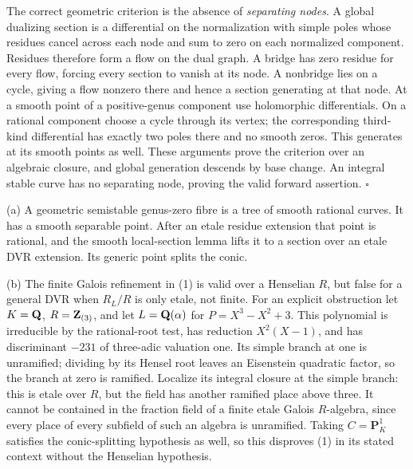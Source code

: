 \documentclass[11pt]{article}
\let\chapterexercise\exercise
\renewcommand{\exercise}[2]{\Needspace{8\baselineskip}\chapterexercise{#1}{#2}}
\begin{document}
The correct geometric criterion is the absence of \emph{separating nodes}. A global dualizing section is a differential on the normalization with simple poles whose residues cancel across each node and sum to zero on each normalized component. Residues therefore form a flow on the dual graph. A bridge has zero residue for every flow, forcing every section to vanish at its node. A nonbridge lies on a cycle, giving a flow nonzero there and hence a section generating at that node. At a smooth point of a positive-genus component use holomorphic differentials. On a rational component choose a cycle through its vertex; the corresponding third-kind differential has exactly two poles there and no smooth zeros. This generates at its smooth points as well. These arguments prove the criterion over an algebraic closure, and global generation descends by base change. An integral stable curve has no separating node, proving the valid forward assertion. \hfill$\square$

\pf (a) A geometric semistable genus-zero fibre is a tree of smooth rational curves. It has a smooth separable point. After an etale residue extension that point is rational, and the smooth local-section lemma lifts it to a section over an etale DVR extension. Its generic point splits the conic.

(b) The finite Galois refinement in (1) is valid over a Henselian $R$, but false for a general DVR when $R_L/R$ is only etale, not finite. For an explicit obstruction let $K=\mathbf Q$, $R=\mathbf Z_{(3)}$, and let $L=\mathbf Q(\alpha)$ for $P=X^3-X^2+3$. This polynomial is irreducible by the rational-root test, has reduction $X^2(X-1)$, and has discriminant $-231$ of three-adic valuation one. Its simple branch at one is unramified; dividing by its Hensel root leaves an Eisenstein quadratic factor, so the branch at zero is ramified. Localize its integral closure at the simple branch: this is etale over $R$, but the field has another ramified place above three. It cannot be contained in the fraction field of a finite etale Galois $R$-algebra, since every place of every subfield of such an algebra is unramified. Taking $C=\mathbf P^1_K$ satisfies the conic-splitting hypothesis as well, so this disproves (1) in its stated context without the Henselian hypothesis.
\end{document}
